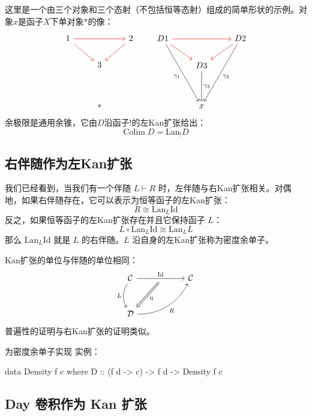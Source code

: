 \documentclass[DaoFP]{subfiles}
\begin{document}
这里是一个由三个对象和三个态射（不包括恒等态射）组成的简单形状的示例。对象$x$是函子$X$下单对象$*$的像：
\[
 \begin{tikzcd}
1 
\arrow[rr, red]
\arrow[rd, red]
&& 2
\arrow[dl, red]
\\
& 3
\\
\\
& *
 \end{tikzcd}
 \qquad
 \begin{tikzcd}
D 1 
\arrow[rr, red]
\arrow[rd, red]
\arrow[dddr, "\gamma_1"']
&& D 2
\arrow[dl, red]
\arrow[dddl, "\gamma_2"]
\\
& D 3
\arrow[dd, "\gamma_3"]
\\
\\
&x
 \end{tikzcd}
 \]
余极限是通用余锥，它由$D$沿函子$!$的左Kan扩张给出：
\[ \text{Colim}\; D = \text{Lan}_! D \]

\subsection{右伴随作为左Kan扩张}

我们已经看到，当我们有一个伴随 $L \vdash R$ 时，左伴随与右Kan扩张相关。对偶地，如果右伴随存在，它可以表示为恒等函子的左Kan扩张：
\[ R \cong \text{Lan}_L \text{Id} \]
反之，如果恒等函子的左Kan扩张存在并且它保持函子 $L$：
\[ L \circ \text{Lan}_L \text{Id} \cong \text{Lan}_L L \]
那么 $\text{Lan}_L \text{Id}$ 就是 $L$ 的右伴随。$L$ 沿自身的左Kan扩张称为密度余单子。

Kan扩张的单位与伴随的单位相同：
\[
 \begin{tikzcd} [row sep=1cm, column sep=1cm]
 \cat C
 \arrow[rr, "\text{Id}", "" {name=ID, below} ]
 \arrow[d, bend right, "L"']
 && \cat C
 \\
 \cat D
  \arrow[urr, bend right, "R"']
 \arrow[Rightarrow, "\eta",  from=ID]
 \end{tikzcd}
\]
普遍性的证明与右Kan扩张的证明类似。

\begin{exercise}
为密度余单子实现  实例：
\begin{haskell}
data Density f c where
   D :: (f d -> c) -> f d -> Density f c
\end{haskell}
\end{exercise}

\subsection{Day 卷积作为 Kan 扩张}
\end{document}
